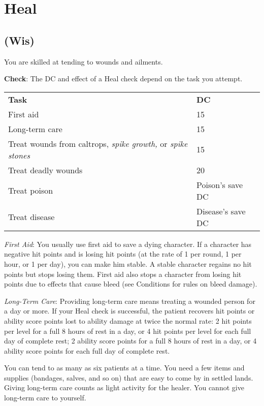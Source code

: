 \section{Heal}

\label{f0}
\subsection{(Wis)}

				
You are skilled at tending to wounds and ailments.
				
\textbf{Check}: The DC and effect of a Heal check depend on the task you attempt.

\begin{table}
\sffamily
 \begin{tabularx}{\linewidth}{Xl}
\textbf{Task} & \textbf{DC}\\
First aid & 15\\
Long-term care & 15\\
Treat wounds from caltrops, \textit{spike growth,} or \textit{spike stones} & 15\\
Treat deadly wounds & 20\\
Treat poison & Poison's save DC\\
Treat disease & Disease's save DC\\
 \end{tabularx}

\end{table}

				
\textit{First Aid}: You usually use first aid to save a dying character. If a character has negative hit points and is losing hit points (at the rate of 1 per round, 1 per hour, or 1 per day), you can make him stable. A stable character regains no hit points but stops losing them. First aid also stops a character from losing hit points due to effects that cause bleed (see Conditions for rules on bleed damage).
				
\textit{Long-Term Care}: Providing long-term care means treating a wounded person for a day or more. If your Heal check is successful, the patient recovers hit points or ability score points lost to ability damage at twice the normal rate: 2 hit points per level for a full 8 hours of rest in a day, or 4 hit points per level for each full day of complete rest; 2 ability score points for a full 8 hours of rest in a day, or 4 ability score points for each full day of complete rest.
				
You can tend to as many as six patients at a time. You need a few items and supplies (bandages, salves, and so on) that are easy to come by in settled lands. Giving long-term care counts as light activity for the healer. You cannot give long-term care to yourself.
				

